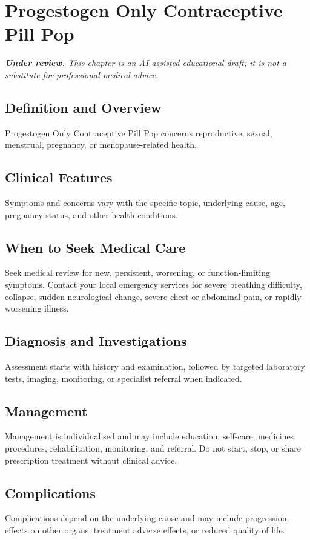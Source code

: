\chapter{Progestogen Only Contraceptive Pill Pop}

\medskip
\noindent\textit{\textbf{Under review.} This chapter is an AI-assisted educational draft; it is not a substitute for professional medical advice.}

\section*{Definition and Overview}
Progestogen Only Contraceptive Pill Pop concerns reproductive, sexual, menstrual, pregnancy, or menopause-related health.

\section*{Clinical Features}
Symptoms and concerns vary with the specific topic, underlying cause, age, pregnancy status, and other health conditions.

\section*{When to Seek Medical Care}
Seek medical review for new, persistent, worsening, or function-limiting symptoms. Contact your local emergency services for severe breathing difficulty, collapse, sudden neurological change, severe chest or abdominal pain, or rapidly worsening illness.

\section*{Diagnosis and Investigations}
Assessment starts with history and examination, followed by targeted laboratory tests, imaging, monitoring, or specialist referral when indicated.

\section*{Management}
Management is individualised and may include education, self-care, medicines, procedures, rehabilitation, monitoring, and referral. Do not start, stop, or share prescription treatment without clinical advice.

\section*{Complications}
Complications depend on the underlying cause and may include progression, effects on other organs, treatment adverse effects, or reduced quality of life.

